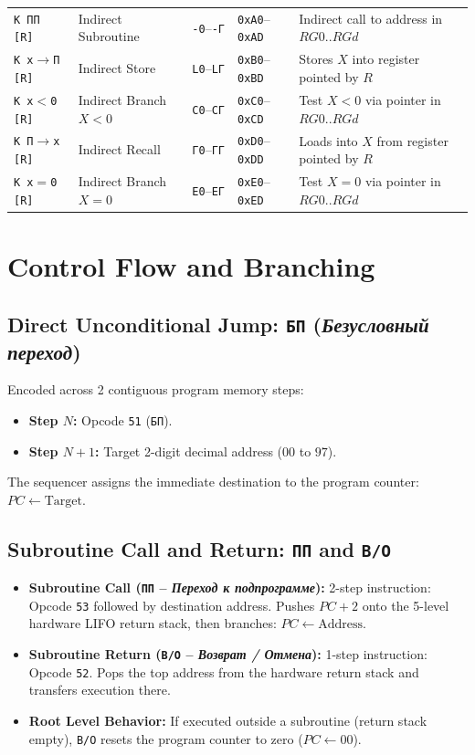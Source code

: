 \documentclass[11pt,a4paper]{article}
\begin{document}
{\begin{longtable}{p{2.2cm}p{3.0cm}>{\centering\arraybackslash}p{1.0cm}>{\centering\arraybackslash}p{1.2cm}p{7.3cm}}
\texttt{K ПП [R]} & Indirect Subroutine & \texttt{-0}--\texttt{-Г} & \texttt{0xA0}--\texttt{0xAD} & Indirect call to address in $RG0..RGd$ \\
\texttt{K x$\to$П [R]} & Indirect Store & \texttt{L0}--\texttt{LГ} & \texttt{0xB0}--\texttt{0xBD} & Stores $X$ into register pointed by $R$ \\
\texttt{K x$<$0 [R]} & Indirect Branch $X < 0$ & \texttt{C0}--\texttt{CГ} & \texttt{0xC0}--\texttt{0xCD} & Test $X < 0$ via pointer in $RG0..RGd$ \\
\texttt{K П$\to$x [R]} & Indirect Recall & \texttt{Г0}--\texttt{ГГ} & \texttt{0xD0}--\texttt{0xDD} & Loads into $X$ from register pointed by $R$ \\
\texttt{K x$=$0 [R]} & Indirect Branch $X = 0$ & \texttt{E0}--\texttt{EГ} & \texttt{0xE0}--\texttt{0xED} & Test $X = 0$ via pointer in $RG0..RGd$ \\
\bottomrule
\end{longtable}
}

\newpage

\section{Control Flow and Branching}

\subsection{Direct Unconditional Jump: \texttt{БП} (\textit{Безусловный переход})}
Encoded across 2 contiguous program memory steps:
\begin{itemize}
    \item \textbf{Step $N$:} Opcode \texttt{51} (\texttt{БП}).
    \item \textbf{Step $N+1$:} Target 2-digit decimal address ($00$ to $97$).
\end{itemize}
The sequencer assigns the immediate destination to the program counter: $PC \leftarrow \text{Target}$.

\subsection{Subroutine Call and Return: \texttt{ПП} and \texttt{В/О}}
\begin{itemize}
    \item \textbf{Subroutine Call (\texttt{ПП} -- \textit{Переход к подпрограмме}):}
    2-step instruction: Opcode \texttt{53} followed by destination address. Pushes $PC + 2$ onto the 5-level hardware LIFO return stack, then branches: $PC \leftarrow \text{Address}$.
    \item \textbf{Subroutine Return (\texttt{В/О} -- \textit{Возврат / Отмена}):}
    1-step instruction: Opcode \texttt{52}. Pops the top address from the hardware return stack and transfers execution there.
    \item \textbf{Root Level Behavior:} If executed outside a subroutine (return stack empty), \texttt{В/О} resets the program counter to zero ($PC \leftarrow 00$).
\end{itemize}
\end{document}
